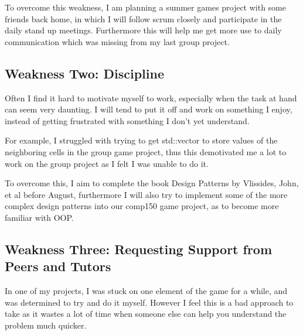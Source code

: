 \documentclass{scrartcl}
\begin{document}
{To overcome this weakness, I am planning a summer games project with some friends back home, in which I will follow scrum closely and participate in the daily stand up meetings. Furthermore this will help me get more use to daily communication which was missing from my last group project.

\subsection{Weakness Two: Discipline}

Often I find it hard to motivate myself to work, especially when the task at hand can seem very daunting. I will tend to put it off and work on something I enjoy, instead of getting frustrated with something I don't yet understand.


For example, I struggled with trying to get std::vector to store values of the neighboring cells in the group game project, thus this demotivated me a lot to work on the group project as I felt I was unable to do it. 

 
To overcome this, I aim to complete the book Design Patterns by Vlissides, John, et al before August, furthermore I will also try to implement some of the more complex design patterns into our comp150 game project, as to become more familiar with OOP.

\subsection{Weakness Three: Requesting Support from Peers and Tutors}


In one of my projects, I was stuck on one element of the game for a while, and was determined to try and do it myself. However I feel this is a bad approach to take as it wastes a lot of time when someone else can help you understand the problem much quicker.

}
\end{document}
